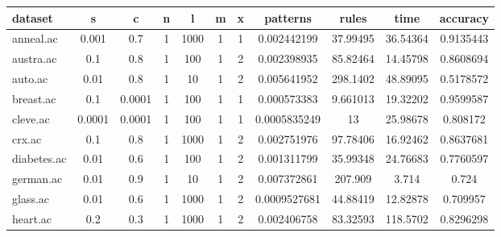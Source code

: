 \begin{table}[htbp]
	\centering
		\begin{tabular}{|l|c|c|c|c|c|c|c|c|c|c|}
		\hline
		\textbf{dataset}	& \textbf{s}	& \textbf{c}	& \textbf{n}	& \textbf{l}	& \textbf{m}	& \textbf{x}	& \textbf{patterns}	& \textbf{rules}	& \textbf{time}	& \textbf{accuracy}	\\
		\hline
		anneal.ac      & 0.001    & 0.7         & 1              & 1000                & 1             & 1             & 0.002442199    & 37.99495       & 36.54364       & 0.9135443      \\
		\hline
		austra.ac      & 0.1      & 0.8         & 1              & 100                 & 1             & 2             & 0.002398935    & 85.82464       & 14.45798       & 0.8608694      \\
		\hline
		auto.ac        & 0.01     & 0.8         & 1              & 10                  & 1             & 2             & 0.005641952    & 298.1402       & 48.89095       & 0.5178572      \\
		\hline
		breast.ac      & 0.1      & 0.0001      & 1              & 100                 & 1             & 1             & 0.000573383    & 9.661013       & 19.32202       & 0.9599587      \\
		\hline
		cleve.ac       & 0.0001   & 0.0001      & 1              & 100                 & 1             & 1             & 0.0005835249   & 13             & 25.98678       & 0.808172       \\
		\hline
		crx.ac         & 0.1      & 0.8         & 1              & 1000                & 1             & 2             & 0.002751976    & 97.78406       & 16.92462       & 0.8637681      \\
		\hline
		diabetes.ac    & 0.01     & 0.6         & 1              & 100                 & 1             & 2             & 0.001311799    & 35.99348       & 24.76683       & 0.7760597      \\
		\hline
		german.ac      & 0.01     & 0.9         & 1              & 10                  & 1             & 2             & 0.007372861    & 207.909        & 3.714          & 0.724          \\
		\hline
		glass.ac       & 0.01     & 0.6         & 1              & 1000                & 1             & 2             & 0.0009527681   & 44.88419       & 12.82878       & 0.709957       \\
		\hline
		heart.ac       & 0.2      & 0.3         & 1              & 1000                & 1             & 2             & 0.002406758    & 83.32593       & 118.5702       & 0.8296298      \\

\end{tabular}
\end{table}
